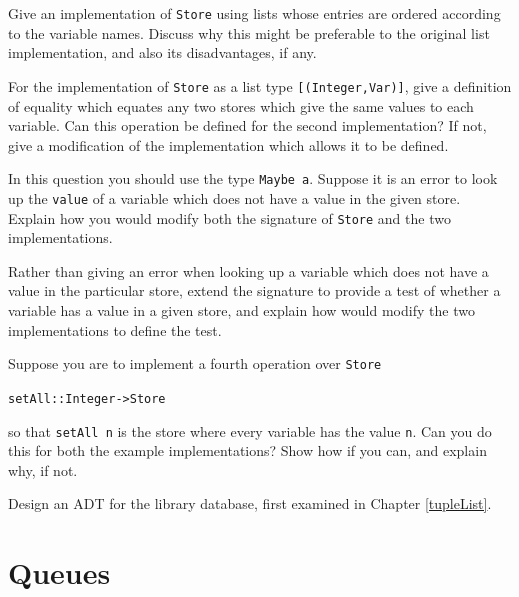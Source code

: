 \begin{exercises}

\item
Give an implementation of \texttt{Store} using lists whose entries are ordered
according to the variable names. Discuss why this might be preferable to the
original list implementation, and also its disadvantages, if any.

\item 
For the implementation of \texttt{Store} as a list type \texttt{[(Integer,Var)]}, give a
definition of equality which equates any two stores which give the same values
to each variable. Can this operation be defined for the second implementation?
If not, give a modification of the implementation which allows it to be
defined.

\item
In this question you should use the type \texttt{Maybe a}.
Suppose it is an error to look up the \texttt{value}
of a variable which does not have a value in the given store. Explain how you
would modify both the signature of \texttt{Store} and the two implementations.

\item
Rather than giving an error when looking up a variable which does not have a
value in the particular store, extend the signature to provide a test of
whether a variable has a value in a given store, and explain how  would
modify the two implementations to define the test.

\item
Suppose you are to implement a fourth operation over \texttt{Store}
\begin{alltt}
setAll :: Integer -> Store
\end{alltt}
so that \texttt{setAll n} is the store where every variable has the value 
\texttt{n}. Can you do this for both the example implementations? Show how if you
can, and explain why, if not.

\item 
Design an ADT for the library database, first examined in
Chapter \ref{tupleList}.
\end{exercises}


\section{Queues}

